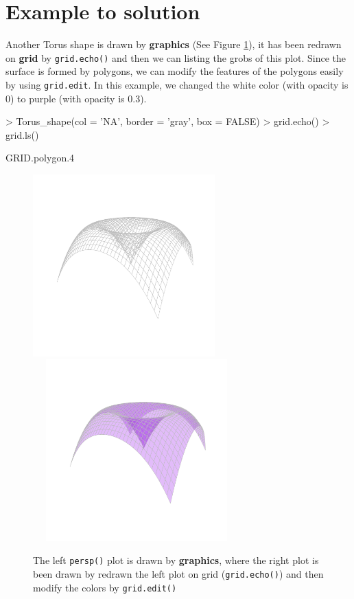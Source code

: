 \documentclass[11pt,twoside]{report}
\begin{document}
\section{Example to solution}
Another Torus shape is drawn by \textbf{graphics} (See Figure \ref{Example_6.3}), it has been redrawn on \textbf{grid} by \texttt{grid.echo()} and then we can listing the grobs of this plot. Since the surface is formed by polygons, we can modify the features of the polygons easily by using \texttt{grid.edit}. In this example, we changed the white color (with opacity is 0) to purple (with opacity is 0.3).\\
\begin{Schunk}
\begin{Sinput}
> Torus_shape(col = 'NA', border = 'gray', box = FALSE)
> grid.echo()
> grid.ls()
\end{Sinput}
\begin{Soutput}
GRID.polygon.4
\end{Soutput}
\end{Schunk}

\begin{figure}[h]
	\begin{center}
		\includegraphics[height = 7cm, width = 7cm]{figure/Chapter6_example_1_2.pdf}
		\includegraphics[height = 7cm, width = 8cm]{figure/Chapter6_example_1_3.pdf}
		\caption{The left \texttt{persp()} plot is drawn by \textbf{graphics}, where the right plot is been drawn by redrawn the left plot on grid (\texttt{grid.echo()}) and then modify the colors by \texttt{grid.edit()}}
		\label{Example_6.3}
	\end{center}
\end{figure}
\end{document}
